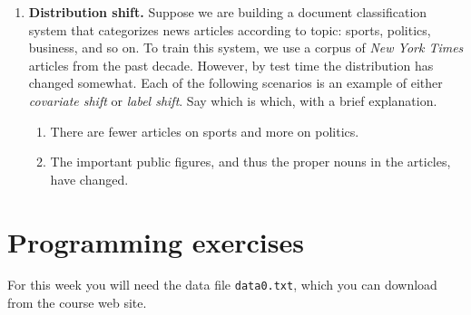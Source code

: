 \documentclass{article}
\begin{document}
\begin{enumerate}[label=\textbf{\arabic*.}]
\item \textbf{Distribution shift.}
      Suppose we are building a document classification system that
      categorizes news articles according to topic: sports, politics,
      business, and so on.  To train this system, we use a corpus of
      \emph{New York Times} articles from the past decade.  However, by
      test time the distribution has changed somewhat.  Each of the
      following scenarios is an example of either \emph{covariate shift}
      or \emph{label shift}.  Say which is which, with a brief
      explanation.
      \begin{enumerate}[label=(\alph*)]
      \item There are fewer articles on sports and more on politics.
      \item The important public figures, and thus the proper nouns in the articles, have changed.
      \end{enumerate}
\end{enumerate}

\section*{Programming exercises}

For this week you will need the data file \texttt{data0.txt}, which you can
download from the course web site.
\end{document}
